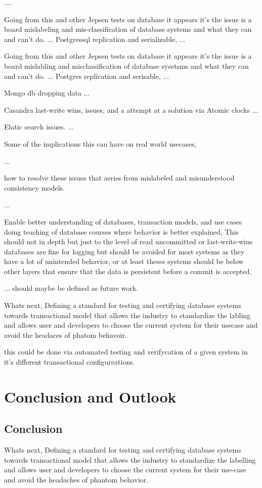 \documentclass[a4paper,10pt,titlepage]{report}
\begin{document}
    ....

    Going from this and other Jepsen tests on database it appears it's the issue is a board mislabeling and mis-classification of database systems and what they can and can't do.
    ...
    Postgressql replication and serializable,
    ...

    Going from this and other Jepsen tests on database it appears it's the issue is a board mislabling and misclassification of database sysetsms and what they can and can't do.
    ...
    Postgres replication and serisable,
    ...

    Mongo db dropping data
    ...

    Casandra last-write wins, issues, and a attempt at a solution via Atomic clocks
    ...

    Elatic search issues.
    ...

    Some of the implications this can have on real world usecases,

    ...

    how to resolve these issues that aeries from mislabeled and misunderstood consistency models.

    ...

    Enable better understanding of databases, transaction models, and use cases doing teaching of database courses where behavior is better explained, This should not in depth but just to the level of read uncommitted or last-write-wins databases are fine for logging but should be avoided for most systems as they have a lot of unintended behavior, or at least theses systems should be below other layers that ensure that the data is persistent before a commit is accepted.

    ... should maybe be defined as future work.

    Whats next, Defining a standard for testing and certifying database systems towards transactional model that allows the industry to standardize the labling and allows user and developers to choose the current system for their usecase and avoid the headaces of phatom behavoir.

    this could be done via automated testing and verifycation of a given system in it's different transactional configureations.


    \chapter{Conclusion and Outlook}
    \section*{Conclusion}
Whats next, Defining a standard for testing and certifying database systems towards transactional model that allows the industry to standardize the labelling and allows user and developers to choose the current system for their use-case and avoid the headaches of phantom behavior.
\end{document}
